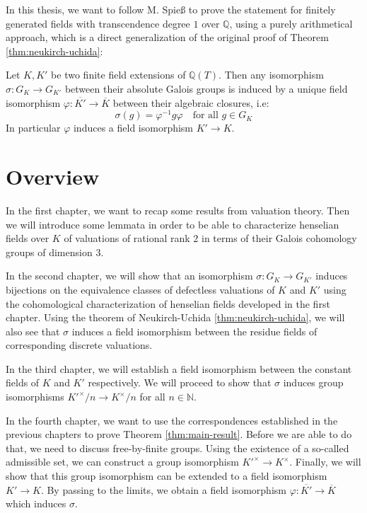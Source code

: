 In this thesis, we want to follow M. Spieß \cite{Sp96} to prove the statement for finitely generated fields with transcendence degree $1$ over $\mathbb{Q}$, using a purely arithmetical approach, which is a direct generalization of the original proof of Theorem \ref{thm:neukirch-uchida}:

\pagebreak

\begin{theorem}\label{thm:main-result}
Let $K,K'$ be two finite field extensions of $\mathbb{Q}(T)$. Then any isomorphism $\sigma:G_K\to G_{K'}$ between their absolute Galois groups is induced by a unique field isomorphism $\varphi:\overline{K'}\to\overline{K}$ between their algebraic closures, i.e: 
\[\sigma(g) =\varphi^{-1}g\varphi \quad \text{for all }g\in G_K\]
In particular $\varphi$ induces a field isomorphism $K'\to K$.
\end{theorem}

\section{Overview}

In the first chapter, we want to recap some results from valuation theory. Then we will introduce some lemmata in order to be able to characterize henselian fields over $K$ of valuations of rational rank $2$ in terms of their Galois cohomology groups of dimension $3$.

In the second chapter, we will show that an isomorphism $\sigma: G_K\to G_{K'}$ induces bijections on the equivalence classes of defectless valuations of $K$ and $K'$ using the cohomological characterization of henselian fields developed in the first chapter. Using the theorem of Neukirch-Uchida \ref{thm:neukirch-uchida}, we will also see that $\sigma$ induces a field isomorphism between the residue fields of corresponding discrete valuations. 

In the third chapter, we will establish a field isomorphism between the constant fields of $K$ and $K'$ respectively. We will proceed to show that $\sigma$ induces group isomorphisms $K'^\times/n\to K^\times/n$ for all $n\in\mathbb{N}$.

In the fourth chapter, we want to use the correspondences established in the previous chapters to prove Theorem \ref{thm:main-result}. Before we are able to do that, we need to discuss free-by-finite groups. Using the existence of a so-called admissible set, we can construct a group isomorphism $K'^\times\to K^\times$. Finally, we will show that this group isomorphism can be extended to a field isomorphism $K'\to K$. By passing to the limits, we obtain a field isomorphism $\varphi: \overline{K'}\to\overline{K}$ which induces $\sigma$.

